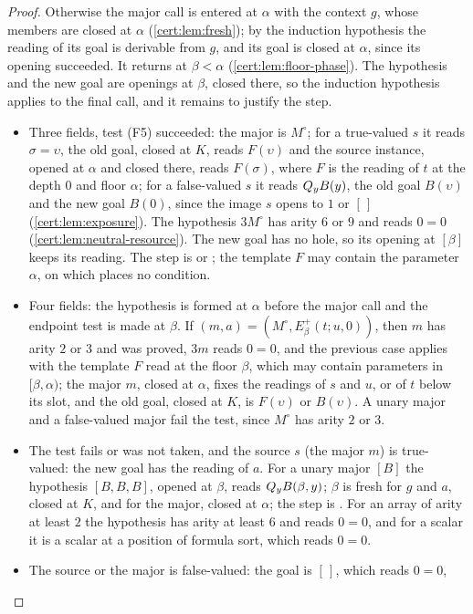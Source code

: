 \begin{proof}
Otherwise the major call is entered at $\alpha$ with the context $g$, whose members
are closed at $\alpha$ (\cref{cert:lem:fresh}); by the induction hypothesis the
reading of its goal is derivable from $g$, and its goal is closed at $\alpha$, since
its opening succeeded. It returns at $\beta<\alpha$
(\cref{cert:lem:floor-phase}). The hypothesis and the new goal are openings at
$\beta$, closed there, so the induction hypothesis applies to the final call, and it
remains to justify the step.
\begin{itemize}
\item Three fields, test (F5) succeeded: the major is $M^{\circ}$; for a true-valued
$s$ it reads $\sigma=\upsilon$, the old goal, closed at $K$, reads $F(\upsilon)$ and
the source instance, opened at $\alpha$ and closed there, reads $F(\sigma)$, where $F$
is the reading of $t$ at the depth $0$ and floor $\alpha$; for a false-valued $s$ it
reads $Q_{y}B(y)$, the old goal $B(\upsilon)$ and the new goal $B(0)$, since the image
$s$ opens to $1$ or $[\,]$ (\cref{cert:lem:exposure}). The hypothesis $3M^{\circ}$ has
arity $6$ or $9$ and reads $0=0$ (\cref{cert:lem:neutral-resource}). The new goal has
no hole, so its opening at $[\beta]$ keeps its reading. The step is  or
; the template $F$ may contain the parameter $\alpha$, on which
 places no condition.
\item Four fields: the hypothesis is formed at $\alpha$ before the major call and the
endpoint test is made at $\beta$. If $(m,a)=(M^{\circ},E^{+}_{\beta}(t;u,0))$, then $m$
has arity $2$ or $3$ and was proved, $3m$ reads $0=0$, and the previous case applies
with the template $F$ read at the floor $\beta$, which may contain parameters in
$[\beta,\alpha)$; the major $m$, closed at $\alpha$, fixes the readings of $s$ and
$u$, or of $t$ below its slot, and the old goal, closed at $K$, is $F(\upsilon)$ or
$B(\upsilon)$. A unary major and a false-valued major fail the test, since
$M^{\circ}$ has arity $2$ or $3$.
\item The test fails or was not taken, and the source $s$ (the major $m$) is
true-valued: the new goal has the reading of $a$. For a unary major $[B]$ the
hypothesis $[B,B,B]$, opened at $\beta$, reads $Q_{y}B(\beta,y)$; $\beta$ is fresh for
$g$ and $a$, closed at $K$, and for the major, closed at $\alpha$; the step is
. For an array of arity at least $2$ the hypothesis has arity at least $6$
and reads $0=0$, and for a scalar it is a scalar at a position of formula sort, which
reads $0=0$.
\item The source or the major is false-valued: the goal is $[\,]$, which reads $0=0$,

\end{itemize}
\end{proof}
